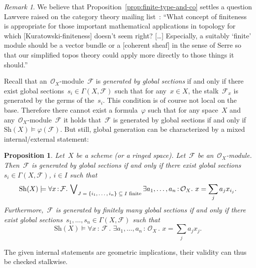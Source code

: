 \documentclass[10pt,reqno,a4paper]{amsbook}
\makeatletter
\theoremstyle{definition}
\theoremstyle{plain}
\newtheorem{prop}[defn]{Proposition}
\theoremstyle{remark}
\newtheorem{rem}[defn]{Remark}
\newcommand{\F}{\mathcal{F}}
\renewcommand{\O}{\mathcal{O}}
\newcommand{\Sh}{\mathrm{Sh}}
\newcommand{\?}{\,{:}\,}
\renewcommand{\_}{\mathpunct{.}\,}
\renewenvironment{proof}[1][\proofname]{\par
  \pushQED{\qed}%
  \normalfont \topsep6\p@\@plus6\p@\relax
  \trivlist
  \item[\hskip\labelsep
        \itshape
    #1\@addpunct{.}]\ignorespaces
}{%
  \popQED\endtrivlist\@endpefalse
}
\makeatother
\begin{document}
\begin{rem}We believe that Proposition~\ref{prop:finite-type-and-co} settles a
question Lawvere raised on the category theory mailing
list~\cite{lawvere:finiteness-question}: ``What concept of finiteness is
appropriate for those important mathematical applications in topology for which
[Kuratowski-finiteness] doesn't seem right? [\ldots\!] Especially, a suitably
`finite' module should be a vector bundle or a [coherent sheaf] in the sense of
Serre so that our simplified topos theory could apply more directly to those
things it should.''
\end{rem}

Recall that an~$\O_X$-module~$\F$ is \emph{generated by global sections} if and
only if there exist global sections~$s_i \in \Gamma(X,\F)$ such that for any~$x
\in X$, the stalk~$\F_x$ is generated by the germs of the~$s_i$.
This condition is of course not local on the base. Therefore there cannot
exist a formula~$\varphi$ such that for any space~$X$ and
any~$\O_X$-module~$\F$ it holds that~$\F$ is generated by global sections if
and only if~$\Sh(X) \models \varphi(\F)$. But still, global generation can be
characterized by a mixed internal/external statement:

\begin{prop}Let~$X$ be a scheme (or a ringed space). Let~$\F$ be
an~$\O_X$-module. Then~$\F$ is generated by global sections if and only if
there exist global sections~$s_i \in \Gamma(X,\F)$, $i \in I$ such that
\[ \Sh(X) \models \forall x\?\F\_ \bigvee\nolimits_{\textnormal{$J=\{i_1,\ldots,i_n\} \subseteq I$ finite}}
  \exists a_1,\ldots,a_n\?\O_X\_
  x = \sum_j a_j x_{i_j}. \]
Furthermore,~$\F$ is generated by finitely many global sections if and only if
there exist global sections~$s_1,\ldots,s_n \in \Gamma(X,\F)$ such that
\[ \Sh(X) \models \forall x\?\F\_ \exists a_1,\ldots,a_n\?\O_X\_ x = \sum_j a_j
x_j. \]
\end{prop}
\begin{proof}The given internal statements are geometric implications, their
validity can thus be checked stalkwise.\end{proof}
\end{document}
